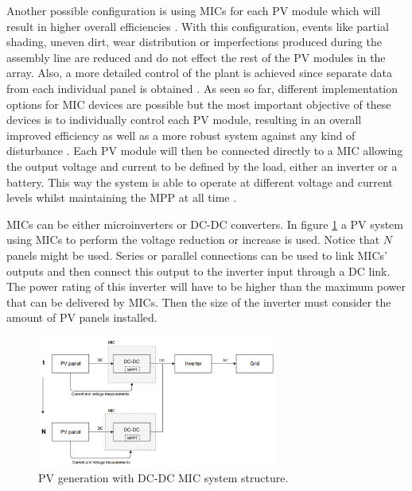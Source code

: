 Another possible configuration is using MICs for each PV module which will result in higher overall efficiencies \cite{ArchitectureMIC}. With this configuration, events like partial shading, uneven dirt, wear distribution or imperfections produced during the assembly line are reduced and do not effect the rest of the PV modules in the array. Also, a more detailed control of the plant is achieved since separate data from each individual panel is obtained \cite{ArchitectureMIC}.
As seen so far, different implementation options for MIC devices are possible but the most important objective of these devices is to individually control each PV module, resulting in an overall improved efficiency as well as a more robust system against any kind of disturbance \cite{ArchitectureMIC}. Each PV module will then be connected directly to a MIC allowing the output voltage and current to be defined by the load, either an inverter or a battery.  This way the system is able to operate at different voltage and current levels whilst maintaining the MPP at all time \cite{ArchitectureMIC}. 

MICs can be either microinverters or DC-DC converters. In figure \ref{MIC_dcdc} a PV system using MICs to perform the voltage reduction or increase is used. Notice that $N$ panels might be used. Series or parallel connections can be used to link MICs' outputs and then connect this output to the inverter input through a DC link.  The power rating of this inverter will have to be higher than the maximum power that can be delivered by MICs. Then the size of the inverter must consider the amount of PV panels installed.

\begin{figure}[H]
	\begin{center}
		\includegraphics[width=0.7\textwidth]{../Pictures/MIC_dcdc}
		\caption{PV generation with DC-DC MIC system structure.}
		\label{MIC_dcdc}
	\end{center}	
\end{figure}

